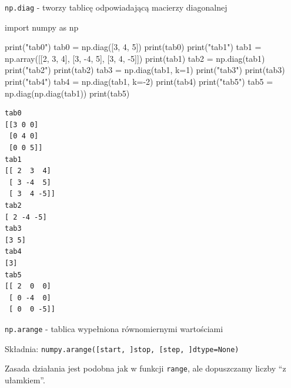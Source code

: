\documentclass[
  letterpaper,
  DIV=11,
  numbers=noendperiod]{scrreprt}
\newenvironment{Shaded}{\begin{snugshade}}{\end{snugshade}}
\newcommand{\BuiltInTok}[1]{\textcolor[rgb]{0.00,0.23,0.31}{#1}}
\newcommand{\DecValTok}[1]{\textcolor[rgb]{0.68,0.00,0.00}{#1}}
\newcommand{\ImportTok}[1]{\textcolor[rgb]{0.00,0.46,0.62}{#1}}
\newcommand{\NormalTok}[1]{\textcolor[rgb]{0.00,0.23,0.31}{#1}}
\newcommand{\OperatorTok}[1]{\textcolor[rgb]{0.37,0.37,0.37}{#1}}
\newcommand{\StringTok}[1]{\textcolor[rgb]{0.13,0.47,0.30}{#1}}
\begin{document}
\texttt{np.diag} - tworzy tablicę odpowiadającą macierzy diagonalnej

\begin{Shaded}
\begin{Highlighting}[]
\ImportTok{import}\NormalTok{ numpy }\ImportTok{as}\NormalTok{ np}

\BuiltInTok{print}\NormalTok{(}\StringTok{"tab0"}\NormalTok{)}
\NormalTok{tab0 }\OperatorTok{=}\NormalTok{ np.diag([}\DecValTok{3}\NormalTok{, }\DecValTok{4}\NormalTok{, }\DecValTok{5}\NormalTok{])}
\BuiltInTok{print}\NormalTok{(tab0)}
\BuiltInTok{print}\NormalTok{(}\StringTok{"tab1"}\NormalTok{)}
\NormalTok{tab1 }\OperatorTok{=}\NormalTok{ np.array([[}\DecValTok{2}\NormalTok{, }\DecValTok{3}\NormalTok{, }\DecValTok{4}\NormalTok{], [}\DecValTok{3}\NormalTok{, }\OperatorTok{{-}}\DecValTok{4}\NormalTok{, }\DecValTok{5}\NormalTok{], [}\DecValTok{3}\NormalTok{, }\DecValTok{4}\NormalTok{, }\OperatorTok{{-}}\DecValTok{5}\NormalTok{]])}
\BuiltInTok{print}\NormalTok{(tab1)}
\NormalTok{tab2 }\OperatorTok{=}\NormalTok{ np.diag(tab1)}
\BuiltInTok{print}\NormalTok{(}\StringTok{"tab2"}\NormalTok{)}
\BuiltInTok{print}\NormalTok{(tab2)}
\NormalTok{tab3 }\OperatorTok{=}\NormalTok{ np.diag(tab1, k}\OperatorTok{=}\DecValTok{1}\NormalTok{)}
\BuiltInTok{print}\NormalTok{(}\StringTok{"tab3"}\NormalTok{)}
\BuiltInTok{print}\NormalTok{(tab3)}
\BuiltInTok{print}\NormalTok{(}\StringTok{"tab4"}\NormalTok{)}
\NormalTok{tab4 }\OperatorTok{=}\NormalTok{ np.diag(tab1, k}\OperatorTok{={-}}\DecValTok{2}\NormalTok{)}
\BuiltInTok{print}\NormalTok{(tab4)}
\BuiltInTok{print}\NormalTok{(}\StringTok{"tab5"}\NormalTok{)}
\NormalTok{tab5 }\OperatorTok{=}\NormalTok{ np.diag(np.diag(tab1))}
\BuiltInTok{print}\NormalTok{(tab5)}
\end{Highlighting}
\end{Shaded}

\begin{verbatim}
tab0
[[3 0 0]
 [0 4 0]
 [0 0 5]]
tab1
[[ 2  3  4]
 [ 3 -4  5]
 [ 3  4 -5]]
tab2
[ 2 -4 -5]
tab3
[3 5]
tab4
[3]
tab5
[[ 2  0  0]
 [ 0 -4  0]
 [ 0  0 -5]]
\end{verbatim}

\texttt{np.arange} - tablica wypełniona równomiernymi wartościami

Składnia:
\texttt{numpy.arange({[}start,\ {]}stop,\ {[}step,\ {]}dtype=None)}

Zasada działania jest podobna jak w funkcji \texttt{range}, ale
dopuszczamy liczby ``z ułamkiem''.
\end{document}
